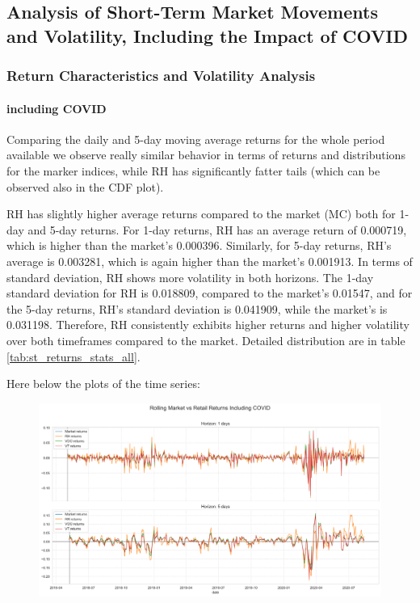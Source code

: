 \subsection{Analysis of Short-Term Market Movements and Volatility, Including the Impact of COVID}

\subsubsection{Return Characteristics and Volatility Analysis}
\paragraph{including COVID}
Comparing the daily and 5-day moving average returns for the whole period available we observe really similar behavior in terms of returns and distributions for the marker indices,
while RH has significantly fatter tails (which can be observed also in the CDF plot).

RH has slightly higher average returns compared to the market (MC) both for 1-day and 5-day returns. For 1-day returns, RH has an average return of 0.000719, which is higher than the market's 0.000396. 
Similarly, for 5-day returns, RH's average is 0.003281, which is again  higher than the market's 0.001913. 
In terms of standard deviation, RH shows more volatility in both horizons. 
The 1-day standard deviation for RH is 0.018809, compared to the market's 0.01547, and for the 5-day returns, RH's standard deviation is 0.041909, while the market's is 0.031198. 
Therefore, RH consistently exhibits higher returns and higher volatility over both timeframes compared to the market. Detailed distribution are in table \ref{tab:st_returns_stats_all}.

Here below the plots of the time series:
\begin{figure}[H]
    \centering
    \includegraphics[width=1\linewidth]{Images/ts_including_1_5.png}
\end{figure}


